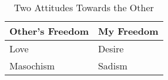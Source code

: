\begin{table}[H]
    \centering
    \begin{tabular}{@{}ll@{}}
    \toprule
    Other's Freedom & My Freedom \\ \midrule
    Love            & Desire     \\
    Masochism       & Sadism     \\ \bottomrule
    \end{tabular}
    \caption{Two Attitudes Towards the Other}
    \label{tab:love}
\end{table}